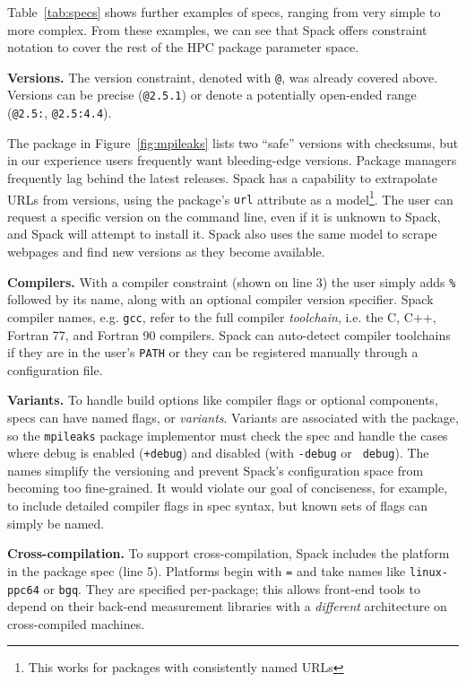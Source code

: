 Table~\ref{tab:specs} shows further examples of specs, ranging from very
simple to more complex. From these examples, we can see that Spack offers constraint
notation to cover the rest of the HPC package parameter space.

{\bf Versions.}
The version constraint, denoted with {\tt @}, was already covered above. Versions
can be precise ({\tt @2.5.1}) or denote a potentially open-ended 
range ({\tt @2.5:}, {\tt @2.5:4.4}).

The package in Figure~\ref{fig:mpileaks} lists two ``safe'' versions with checksums, but
in our experience users frequently want bleeding-edge versions.  Package managers
frequently lag behind the latest releases. 
Spack has a capability to extrapolate URLs from versions,
using the package's {\tt url} attribute as a model\footnote{This works
for packages with consistently named URLs}.  The user can request a specific
version on the command line, even if it is unknown to Spack,
and Spack will attempt to install it.  Spack also uses the same
model to scrape webpages and find new versions as they become available.

{\bf Compilers.}
With a compiler constraint (shown on line 3) the user
simply adds {\tt \%} followed by its name, along with an optional compiler version 
specifier.  Spack compiler names, e.g. {\tt gcc}, refer to the full compiler {\it toolchain},
i.e. the C, C++, Fortran 77, and Fortran 90 compilers.  Spack can auto-detect
compiler toolchains if they are in the user's {\tt PATH} or they can be registered manually
through a configuration file.

{\bf Variants.}
To handle build options like compiler flags or optional components, specs can
have named flags, or {\it variants}.  Variants are associated with the package,
so the {\tt mpileaks} package implementor must check the spec and handle the cases
where debug is enabled ({\tt +debug}) and disabled (with {\tt -debug}
or {\tt ~debug}).  The names simplify the versioning and prevent
Spack's configuration space from becoming too fine-grained.
It would violate our goal of conciseness, for example, to include detailed 
compiler flags in spec syntax, but known sets of flags can simply be named.

{\bf Cross-compilation.}
To support cross-compilation, Spack includes the platform in the package spec (line 5).
Platforms begin with {\tt =} and take names like {\tt linux-ppc64} or {\tt bgq}.  They are
specified per-package; this allows front-end tools to depend on their back-end measurement
libraries with a {\it different} architecture on cross-compiled machines.

